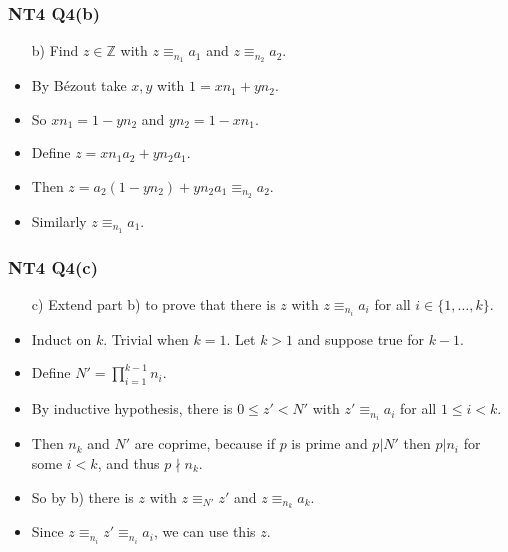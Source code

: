 \documentclass[handout]{beamer}
\newcommand{\bZ}{\mathbb{Z}}
\begin{document}
\begin{frame}
\frametitle{NT4 Q4(b)}
\begin{enumerate}
\item[b)] Find $z\in\bZ$ with $z\equiv_{n_1} a_1$ and $z\equiv_{n_2} a_2$. 
\end{enumerate}
\vspace{1cm}
\begin{itemize}
\item By B\'ezout take $x,y$ with $1=xn_1+yn_2$.
\vspace{0.5cm}
\item So $xn_1 = 1- yn_2$ and $yn_2 = 1-xn_1$.
\vspace{0.5cm}
\item Define $z = xn_1a_2+yn_2a_1$.
\vspace{0.5cm}
\item Then $z = a_2(1-yn_2) + yn_2a_1 \equiv_{n_2} a_2$.
\vspace{0.5cm}
\item Similarly $z\equiv_{n_1} a_1$.
\end{itemize}
\end{frame}

\begin{frame}
\frametitle{NT4 Q4(c)}
\begin{enumerate}
\item[c)] Extend part b) to prove that there is $z$ with $z \equiv_{n_i} a_i$ for all $i\in\{1,\ldots ,k\}$.
\end{enumerate}
\vspace{0.5cm}
\begin{itemize}
\item Induct on $k$. Trivial when $k=1$. Let $k>1$ and suppose true for $k-1$.
\vspace{0.2cm}
\item Define $N' = \prod_{i=1}^{k-1} n_i$.
\vspace{0.2cm}
\item By inductive hypothesis, there is $0\leq z'<N'$ with $z' \equiv_{n_i} a_i$ for all $1\leq i < k$.
\vspace{0.2cm}
\item Then $n_k$ and $N'$ are coprime, because if $p$ is prime and $p| N'$ then $p|n_i$ for some $i<k$, and thus $p\nmid n_k$.
\vspace{0.2cm}
\item So by b) there is $z$ with $z \equiv_{N'} z'$ and $z\equiv_{n_k} a_k$.
\vspace{0.2cm}
\item Since $z \equiv_{n_i} z' \equiv_{n_i} a_i$, we can use this $z$.
\end{itemize}
\end{frame}
\end{document}
